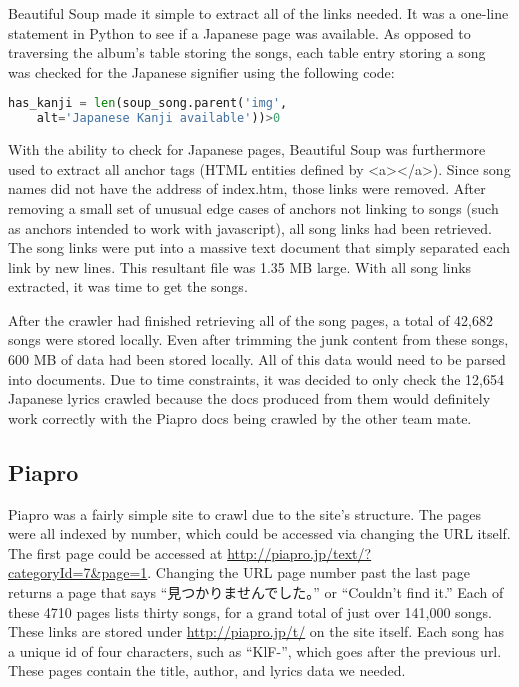 \documentclass{acm} %
\begin{document}
\begin{CJK}{UTF8}{zhsong}

Beautiful Soup made it simple to extract all of the links needed. It was a one-line statement in Python to see if a Japanese page was available. As opposed to traversing the album's table storing the songs, each table entry storing a song was checked for the Japanese signifier using the following code:

\begin{lstlisting}[language=Python]
has_kanji = len(soup_song.parent('img',
	alt='Japanese Kanji available'))>0
\end{lstlisting}

With the ability to check for Japanese pages, Beautiful Soup was furthermore used to extract all anchor tags (HTML entities defined by <a></a>). Since song names did not have the address of index.htm, those links were removed. After removing a small set of unusual edge cases of anchors not linking to songs (such as anchors intended to work with javascript), all song links had been retrieved. The song links were put into a massive text document that simply separated each link by new lines. This resultant file was 1.35 MB large. With all song links extracted, it was time to get the songs.

After the crawler had finished retrieving all of the song pages, a total of 42,682 songs were stored locally. Even after trimming the junk content from these songs, 600 MB of data had been stored locally. All of this data would need to be parsed into documents. Due to time constraints, it was decided to only check the 12,654 Japanese lyrics crawled because the docs produced from them would definitely work correctly with the Piapro docs being crawled by the other team mate.

\subsection{Piapro}


Piapro was a fairly simple site to crawl due to the site's structure. The pages were all indexed by number, which could be accessed via changing the URL itself. The first page could be accessed at \url{http://piapro.jp/text/?categoryId=7\&page=1}. Changing the URL page number past the last page returns a page that says ``見つかりませんでした。'' or ``Couldn't find it.'' Each of these 4710 pages lists thirty songs, for a grand total of just over 141,000 songs. These links are stored under \url{http://piapro.jp/t/} on the site itself. Each song has a unique id of four characters, such as ``KlF-'', which goes after the previous url. These pages contain the title, author, and lyrics data we needed.


\end{CJK}
\end{document}
